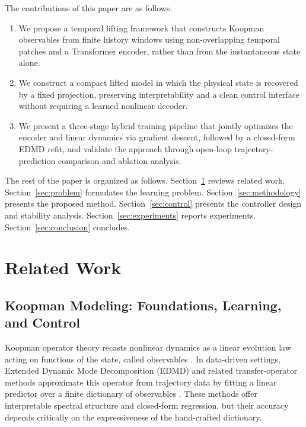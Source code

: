 \documentclass[journal]{IEEEtran}
\begin{document}
The contributions of this paper are as follows.
\begin{enumerate}
    \item We propose a temporal lifting framework that constructs Koopman observables from finite history windows using non-overlapping temporal patches and a Transformer encoder, rather than from the instantaneous state alone.
    \item We construct a compact lifted model in which the physical state is recovered by a fixed projection, preserving interpretability and a clean control interface without requiring a learned nonlinear decoder.
    \item We present a three-stage hybrid training pipeline that jointly optimizes the encoder and linear dynamics via gradient descent, followed by a closed-form EDMD refit, and validate the approach through open-loop trajectory-prediction comparison and ablation analysis.
\end{enumerate}

The rest of the paper is organized as follows. Section~\ref{sec:related_work} reviews related work. Section~\ref{sec:problem} formulates the learning problem. Section~\ref{sec:methodology} presents the proposed method. Section~\ref{sec:control} presents the controller design and stability analysis. Section~\ref{sec:experiments} reports experiments. Section~\ref{sec:conclusion} concludes.

\section{Related Work}
\label{sec:related_work}

\subsection{Koopman Modeling: Foundations, Learning, and Control}

Koopman operator theory recasts nonlinear dynamics as a linear evolution law acting on functions of the state, called observables \cite{koopman1931hamiltonian, koopman1932spectra, mezic2005spectral, rowley2009spectral}. In data-driven settings, Extended Dynamic Mode Decomposition (EDMD) and related transfer-operator methods approximate this operator from trajectory data by fitting a linear predictor over a finite dictionary of observables \cite{williams2015data, williams2015kernel, klus2018data}. These methods offer interpretable spectral structure and closed-form regression, but their accuracy depends critically on the expressiveness of the hand-crafted dictionary.
\end{document}
